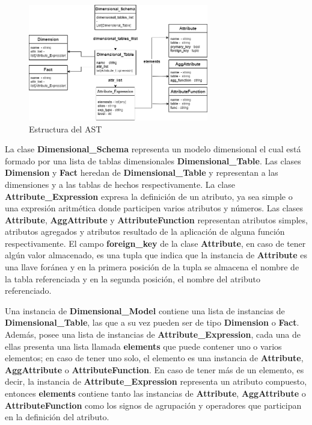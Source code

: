 \begin{figure}[htb]
    \centering
    \includegraphics[width=0.7\textwidth]{Graphics/ast.png}
    \caption{Estructura del AST}
    \label{fig:ast}
\end{figure}

La clase \textbf{Dimensional\_Schema} representa un modelo dimensional el cual est\'a formado por una lista de tablas 
dimensionales \textbf{Dimensional\_Table}. Las clases \textbf{Dimension} y \textbf{Fact} heredan de \textbf{Dimensional\_Table} 
y representan a las dimensiones y a las tablas de hechos respectivamente. La clase \textbf{Attribute\_Expression} expresa 
la definición de un atributo, ya sea simple o una expresión aritmética donde participen varios atributos y n\'umeros. 
Las clases \textbf{Attribute}, \textbf{AggAttribute} y \textbf{AttributeFunction} representan atributos simples, atributos 
agregados y atributos resultado de la aplicación de alguna función respectivamente. El campo \textbf{foreign\_key} de 
la clase \textbf{Attribute}, en caso de tener alg\'un valor almacenado, es una tupla que indica que la instancia 
de \textbf{Attribute} es una llave for\'anea y en la primera posición de la tupla se almacena el nombre de la tabla referenciada y 
en la segunda posición, el nombre del atributo referenciado.

Una instancia de \textbf{Dimensional\_Model} contiene una lista de instancias de \textbf{Dimensional\_Table}, las que a su vez pueden ser de tipo 
\textbf{Dimension} o \textbf{Fact}. Además, posee una lista de instancias de \textbf{Attribute\_Expression}, cada 
una de ellas presenta 
una lista llamada \textbf{elements} que puede contener uno o varios elementos; en caso de tener uno solo, el elemento 
es una instancia de \textbf{Attribute}, \textbf{AggAttribute} o \textbf{AttributeFunction}. En caso de tener 
m\'as de un elemento, es decir, la instancia de \textbf{Attribute\_Expression} representa un atributo compuesto, entonces 
\textbf{elements} contiene tanto las instancias de \textbf{Attribute}, \textbf{AggAttribute} o \textbf{AttributeFunction} como 
los signos de agrupación y operadores que participan en la definición del atributo.

